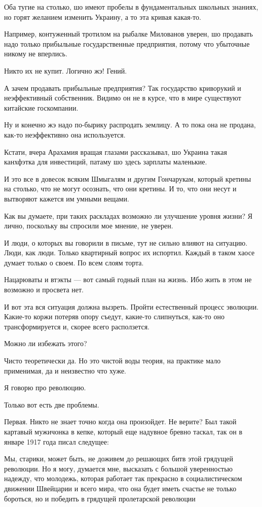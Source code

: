 \begin{multicols}{2}
Оба тугие на столько, шо имеют пробелы в фундаментальных школьных знаниях, но
горят желанием изменить Украину, а то эта кривая какая-то.

Например, контуженный тротилом на рыбалке Милованов уверен, шо продавать надо
только прибыльные государственные предприятия, потому что убыточные никому не
вперлись.

Никто их не купит. Логично жэ! Гений.

А зачем продавать прибыльные предприятия? Так государство криворукий и
неэффективный собственник. Видимо он не в курсе, что в мире существуют
китайские госкомпании.

Ну и конечно жэ надо по-бырику распродать землицу. А то пока она не продана,
как-то неэффективно она используется.

Кстати, вчера Арахамия вращая глазами рассказывал, шо Украина такая канхфэтка
для инвестиций, патаму шо здесь зарплаты маленькие.

И это все в довесок всяким Шмыгалям и другим Гончарукам, который кретины на
столько, что не могут осознать, что они кретины. И то, что они несут и
вытворяют кажется им умными вещами.

Как вы думаете, при таких раскладах возможно ли улучшение уровня жизни? Я
лично, поскольку вы спросили мое мнение, не уверен.

И люди, о которых вы говорили в письме, тут не сильно влияют на ситуацию. Люди,
как люди. Только квартирный вопрос их испортил. Каждый в таком хаосе думает
только о своем. По всем слоям торта.

Нацарюваты и втэкты — вот самый годный план на жизнь. Ибо жить в этом не
возможно и просвета нет.

И вот эта вся ситуация должна вызреть. Пройти естественный процесс эволюции.
Какие-то коржи потеряв опору съедут, какие-то слипнуться, как-то оно
трансформируется и, скорее всего расползется.

Можно ли избежать этого?

Чисто теоретически да. Но это чистой воды теория, на практике мало применимая,
да и неизвестно что хуже.

Я говорю про революцию.

Только вот есть две проблемы.

Первая. Никто не знает точно когда она произойдет. Не верите? Был такой
картавый мужичонка в кепке, который еще надувное бревно таскал, так он в январе
1917 года писал следущее:

\begin{zzquote}
Мы, старики, может быть, не доживем до решающих битв этой грядущей революции.
Но я могу, думается мне, высказать с большой уверенностью надежду, что
молодежь, которая работает так прекрасно в социалистическом движении Швейцарии
и всего мира, что она будет иметь счастье не только бороться, но и победить в
грядущей пролетарской революции	
\end{zzquote}


\end{multicols}
